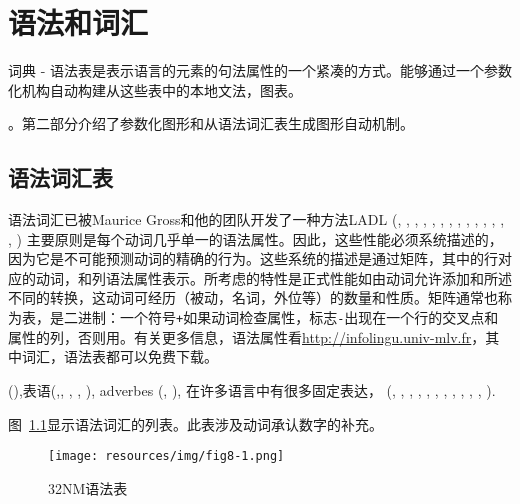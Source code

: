 \chapter{语法和词汇}
\label{chap-lexicon-grammar}
词典 - 语法表是表示语言的元素的句法属性的一个紧凑的方式。能够通过一个参数化机构自动构建从这些表中的本地文法，图表。

\bigskip
{}。第二部分介绍了参数化图形和从语法词汇表生成图形自动机制。



\section{语法词汇表}
语法词汇已被Maurice Gross和他的团队开发了一种方法LADL (\cite{L}, \cite{BGL}, \cite{methodes-en-syntaxe}, \cite{GL},
\cite{gross1994}, \cite{gross1994b}, \cite{gross1991}, \cite{gross1986}, 
\cite{gross1984}, \cite{gross1984b}, \cite{gross1983}, \cite{gross1982}, 
\cite{gross1978}, \cite{leclere2005}, \cite{salkoff2004})
主要原则是每个动词几乎单一的语法属性。因此，这些性能必须系统描述的，因为它是不可能预测动词的精确的行为。这些系统的描述是通过矩阵，其中的行对应的动词，和列语法属性表示。所考虑的特性是正式性能如由动词允许添加和所述不同的转换，这动词可经历（被动，名词，外位等）的数量和性质。矩阵通常也称为表，是二进制：一个符号\verb$+$如果动词检查属性，标志\verb+-+出现在一个行的交叉点和属性的列，否则用。有关更多信息，语法属性看\url{http://infolingu.univ-mlv.fr}，其中词汇，语法表都可以免费下载。

\bigskip
{}(\cite{these-annie}),表语(\cite{les-nominalisations},\cite{les-predicats-nominaux}, \cite{giry1978}, \cite{gross1976},
\cite{ranchhod2001}), adverbes (\cite{syntaxe-de-ladverbe},
\cite{grammaire-des-adverbes}), 在许多语言中有很多固定表达，
(\cite{lexique-grammaire-allemand2}, \cite{lexique-grammaire-italien2},
\cite{lexique-grammaire-italien}, \cite{lexique-grammaire-coreen2},
\cite{lexique-grammaire-coreen}, \cite{lexique-grammaire-malgache},
\cite{lexique-grammaire-espagnol}, \cite{lexique-grammaire-allemand},
\cite{lexique-grammaire-hongrois}, \cite{ranchhod1996}, \cite{ranchhod1991},
\cite{gross1986b}).

\bigskip
\noindent 图~\ref{fig-table-32NM}显示语法词汇的列表。此表涉及动词承认数字的补充。


\begin{figure}[!h]
\begin{center}
\texttt{[image: resources/img/fig8-1.png]}
\caption{32NM语法表\label{fig-table-32NM}}
\end{center}
\end{figure}


